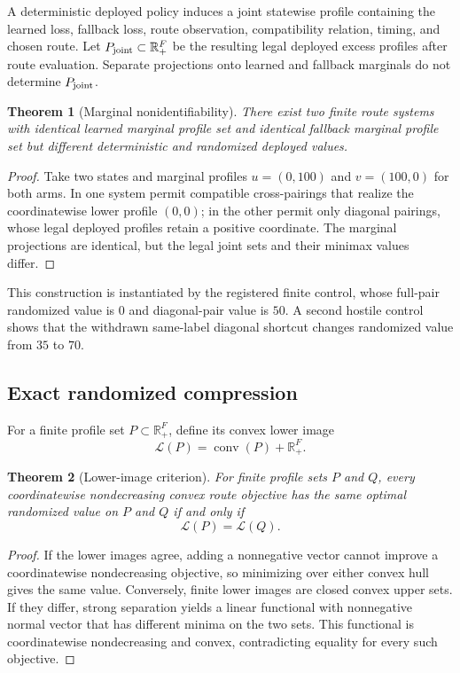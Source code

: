 \documentclass[11pt]{article}
\newtheorem{theorem}{Theorem}
\theoremstyle{definition}
\theoremstyle{remark}
\newcommand{\Rplus}{\mathbb R_{+}}
\newcommand{\conv}{\operatorname{conv}}
\begin{document}
A deterministic deployed policy induces a joint statewise profile containing the learned loss, fallback loss, route observation, compatibility relation, timing, and chosen route.  Let $P_{\rm joint}\subset\Rplus^F$ be the resulting legal deployed excess profiles after route evaluation.  Separate projections onto learned and fallback marginals do not determine $P_{\rm joint}$.

\begin{theorem}[Marginal nonidentifiability]\label{thm:marginal}
There exist two finite route systems with identical learned marginal profile set and identical fallback marginal profile set but different deterministic and randomized deployed values.
\end{theorem}
\begin{proof}
Take two states and marginal profiles $u=(0,100)$ and $v=(100,0)$ for both arms.  In one system permit compatible cross-pairings that realize the coordinatewise lower profile $(0,0)$; in the other permit only diagonal pairings, whose legal deployed profiles retain a positive coordinate.  The marginal projections are identical, but the legal joint sets and their minimax values differ.
\end{proof}

This construction is instantiated by the registered finite control, whose full-pair randomized value is $0$ and diagonal-pair value is $50$.  A second hostile control shows that the withdrawn same-label diagonal shortcut changes randomized value from $35$ to $70$.

\subsection{Exact randomized compression}

For a finite profile set $P\subset\Rplus^F$, define its convex lower image
\[
 \mathcal L(P)=\conv(P)+\Rplus^F.
\]

\begin{theorem}[Lower-image criterion]\label{thm:lowerimage}
For finite profile sets $P$ and $Q$, every coordinatewise nondecreasing convex route objective has the same optimal randomized value on $P$ and $Q$ if and only if
\[
 \mathcal L(P)=\mathcal L(Q).
\]
\end{theorem}
\begin{proof}
If the lower images agree, adding a nonnegative vector cannot improve a coordinatewise nondecreasing objective, so minimizing over either convex hull gives the same value.  Conversely, finite lower images are closed convex upper sets.  If they differ, strong separation yields a linear functional with nonnegative normal vector that has different minima on the two sets.  This functional is coordinatewise nondecreasing and convex, contradicting equality for every such objective.
\end{proof}
\end{document}
